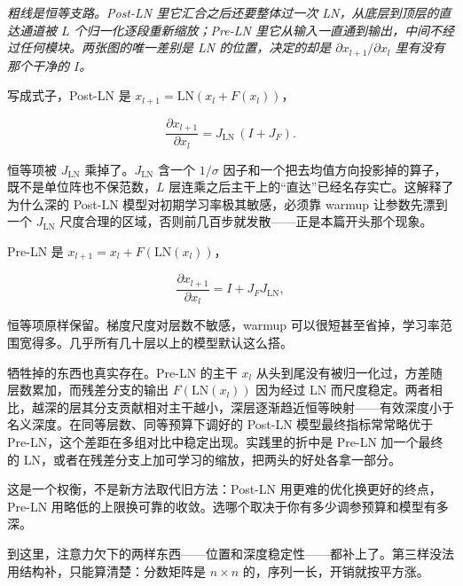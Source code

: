 \begin{center}
\end{center}

\emph{粗线是恒等支路。Post-LN 里它汇合之后还要整体过一次 LN，从底层到顶层的直达通道被 \(L\) 个归一化逐段重新缩放；Pre-LN 里它从输入一直通到输出，中间不经过任何模块。两张图的唯一差别是 LN 的位置，决定的却是 \(\partial x_{l+1}/\partial x_l\) 里有没有那个干净的 \(I\)。}

写成式子，Post-LN 是 \(x_{l+1}=\mathrm{LN}(x_l+F(x_l))\)，

\[
\frac{\partial x_{l+1}}{\partial x_l} = J_{\mathrm{LN}}\,(I+J_F).
\]

恒等项被 \(J_{\mathrm{LN}}\) 乘掉了。\(J_{\mathrm{LN}}\) 含一个 \(1/\sigma\) 因子和一个把去均值方向投影掉的算子，既不是单位阵也不保范数，\(L\) 层连乘之后主干上的``直达''已经名存实亡。这解释了为什么深的 Post-LN 模型对初期学习率极其敏感，必须靠 warmup 让参数先漂到一个 \(J_{\mathrm{LN}}\) 尺度合理的区域，否则前几百步就发散——正是本篇开头那个现象。

Pre-LN 是 \(x_{l+1}=x_l+F(\mathrm{LN}(x_l))\)，

\[
\frac{\partial x_{l+1}}{\partial x_l} = I + J_F J_{\mathrm{LN}},
\]

恒等项原样保留。梯度尺度对层数不敏感，warmup 可以很短甚至省掉，学习率范围宽得多。几乎所有几十层以上的模型默认这么搭。

牺牲掉的东西也真实存在。Pre-LN 的主干 \(x_l\) 从头到尾没有被归一化过，方差随层数累加，而残差分支的输出 \(F(\mathrm{LN}(x_l))\) 因为经过 LN 而尺度稳定。两者相比，越深的层其分支贡献相对主干越小，深层逐渐趋近恒等映射——有效深度小于名义深度。在同等层数、同等预算下调好的 Post-LN 模型最终指标常常略优于 Pre-LN，这个差距在多组对比中稳定出现。实践里的折中是 Pre-LN 加一个最终的 LN，或者在残差分支上加可学习的缩放，把两头的好处各拿一部分。

这是一个权衡，不是新方法取代旧方法：Post-LN 用更难的优化换更好的终点，Pre-LN 用略低的上限换可靠的收敛。选哪个取决于你有多少调参预算和模型有多深。

到这里，注意力欠下的两样东西——位置和深度稳定性——都补上了。第三样没法用结构补，只能算清楚：分数矩阵是 \(n\times n\) 的，序列一长，开销就按平方涨。
